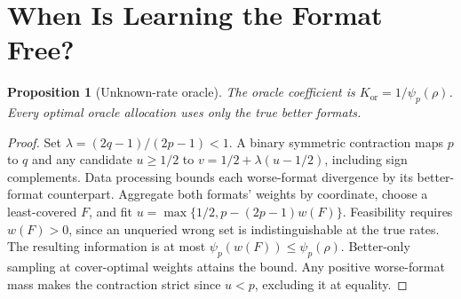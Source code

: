 \documentclass[sigconf,anonymous,review]{acmart}
\newtheorem{proposition}[theorem]{Proposition}
\newcommand{\Kor}{K_{\mathrm{or}}}
\begin{document}
\section{When Is Learning the Format Free?}
\begin{proposition}[Unknown-rate oracle]\label{prop:oracle}
The oracle coefficient is $\Kor=1/\psi_p(\rho)$. Every optimal oracle allocation uses only the true better formats.
\end{proposition}
\begin{proof}
Set $\lambda=(2q-1)/(2p-1)<1$. A binary symmetric contraction maps $p$ to $q$ and any candidate $u\ge1/2$ to $v=1/2+\lambda(u-1/2)$, including sign complements. Data processing bounds each worse-format divergence by its better-format counterpart. Aggregate both formats' weights by coordinate, choose a least-covered $F$, and fit $u=\max\{1/2,p-(2p-1)w(F)\}$. Feasibility requires $w(F)>0$, since an unqueried wrong set is indistinguishable at the true rates. The resulting information is at most $\psi_p(w(F))\le\psi_p(\rho)$. Better-only sampling at cover-optimal weights attains the bound. Any positive worse-format mass makes the contraction strict since $u<p$, excluding it at equality.
\end{proof}
\end{document}
